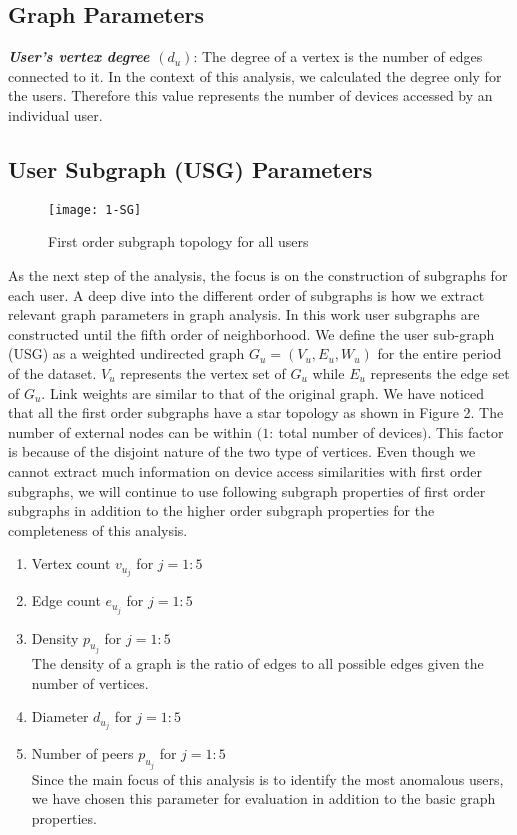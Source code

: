 \documentclass[conference,draftclsnofoot,onecolumn]{IEEEtran}%
\begin{document}
\subsection{Graph  Parameters}

\textbf{\textit{User's vertex degree $(d_{u})$}}:
The degree of a vertex is the number of edges connected to it. In the context of this analysis, we calculated the degree only for the users. Therefore this value represents the number of devices accessed by an individual user.

\subsection{User Subgraph (USG) Parameters}

\begin{figure}[h]
\centering
\texttt{[image: 1-SG]}
\caption{First order subgraph topology for all users}
\label{figure 2}
\vspace{-10pt}
\end{figure}

As the next step of the analysis, the focus is on the construction of subgraphs for each user. A deep dive into the different order of subgraphs is how we extract relevant graph parameters in graph analysis. In this work user subgraphs are constructed until the fifth order of neighborhood. We define the user sub-graph (USG) as a weighted undirected graph $G_{u}=(V_{u},E_{u},W_{u})$ for the entire period of the dataset. $V_{u}$ represents the vertex set of $G_{u}$ while $E_{u}$ represents the edge set of $G_{u}$. Link weights are similar to that of the original graph. We have noticed that all the first order subgraphs have a star topology as shown in Figure 2. The number of external nodes can be within $(1:\ $total number of devices$)$. This factor is because of the disjoint nature of the two type of vertices. Even though we cannot extract much information on device access similarities with first order subgraphs, we will continue to use following subgraph properties of first order subgraphs in addition to the higher order subgraph properties for the completeness of this analysis.

\begin{enumerate}[leftmargin=*]
	\item Vertex count $v_{u_{j}}$ for $j=1:5$
	\item Edge count $e_{u_{j}}$ for $j=1:5$
	\item Density $p_{u_{j}}$ for $j=1:5$
	\\ The density of a graph is the ratio of edges to all possible edges given the number of vertices.
	\item Diameter $d_{u_{j}}$ for $j=1:5$
	\item Number of peers $p_{u_{j}}$ for $j=1:5$
	\\Since the main focus of this analysis is to identify the most anomalous users, we have chosen this parameter for evaluation in addition to the basic graph properties.
	\end{enumerate}
	
\end{document}
